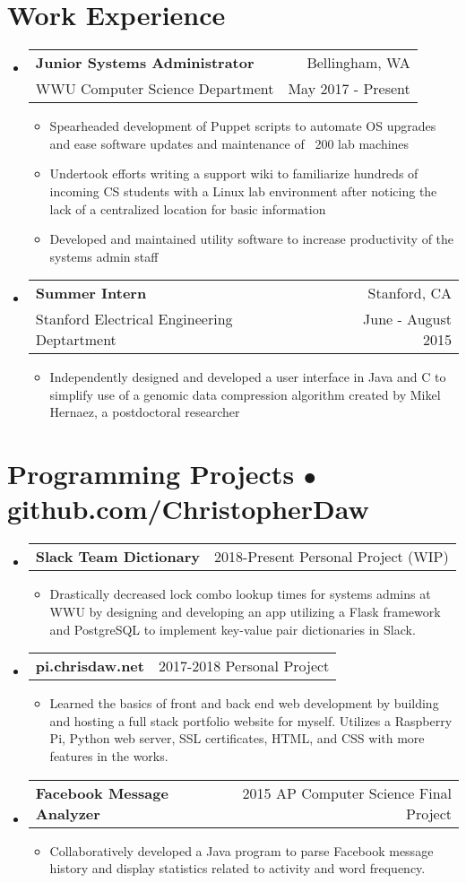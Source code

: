 \documentclass[12pt, letterpaper]{article}
\makeatletter
\newcommand{\resumeItem}[1]{
  \item[$\bullet$]{
    #1 \vspace{-2pt}
  }
}
\newcommand{\resumeSubsection}[4]{
  \item[]
    \begin{tabular*}{0.97\textwidth}{@{\extracolsep{\fill}} l r}
      \textbf{#1} & #2 \vspace{1pt} \\
      #3 & #4 \\
    \end{tabular*}\vspace{-7pt}
}
\newcommand{\resumeProject}[3]{
  \item[]
    \begin{tabular*}{0.97\textwidth}{@{\extracolsep{\fill}} l r}
      \textbf{#1} & #2 \\
    \end{tabular*}\vspace{-7pt}
    \begin{itemize}
        \item[] #3
    \end{itemize}
}
\makeatother
\begin{document}
\section{Work Experience}
  \begin{itemize}[leftmargin=*]
    \resumeSubsection
      {Junior Systems Administrator}{Bellingham, WA}
      {WWU Computer Science Department}{May 2017 - Present}
      \begin{itemize}
        \resumeItem{
          Spearheaded development of Puppet scripts to automate OS upgrades and ease software updates and maintenance of ~200 lab machines}
        \resumeItem{
            Undertook efforts writing a support wiki to familiarize hundreds of incoming CS students with a Linux lab environment after noticing the lack of a centralized location for basic information}
        \resumeItem{
            Developed and maintained utility software to increase productivity of the systems admin staff}
      \end{itemize}

    \resumeSubsection
      {Summer Intern}{Stanford, CA}
      {Stanford Electrical Engineering Deptartment}{June - August 2015}
      \begin{itemize}
        \resumeItem{
            Independently designed and developed a user interface in Java and C to simplify use of a genomic data compression algorithm created by Mikel Hernaez, a postdoctoral researcher}
      \end{itemize}
    \end{itemize}

\vspace{-15pt}

\section{Programming Projects $\bullet$ github.com/ChristopherDaw}
  \begin{itemize}[leftmargin=*]
    \resumeProject
      {Slack Team Dictionary}{2018-Present Personal Project (WIP)}
      {Drastically decreased lock combo lookup times for systems admins at WWU by designing and developing an app utilizing a Flask framework and PostgreSQL to implement key-value pair dictionaries in Slack.}
  \resumeProject
      {pi.chrisdaw.net}{2017-2018 Personal Project}
      {Learned the basics of front and back end web development by building and hosting a full stack portfolio website for myself. Utilizes a Raspberry Pi, Python web server, SSL certificates, HTML, and CSS with more features in the works.}
  \resumeProject
      {Facebook Message Analyzer}{2015 AP Computer Science Final Project}
      {Collaboratively developed a Java program to parse Facebook message history and display statistics related to activity and word frequency.}
  \end{itemize}%
\end{document}
